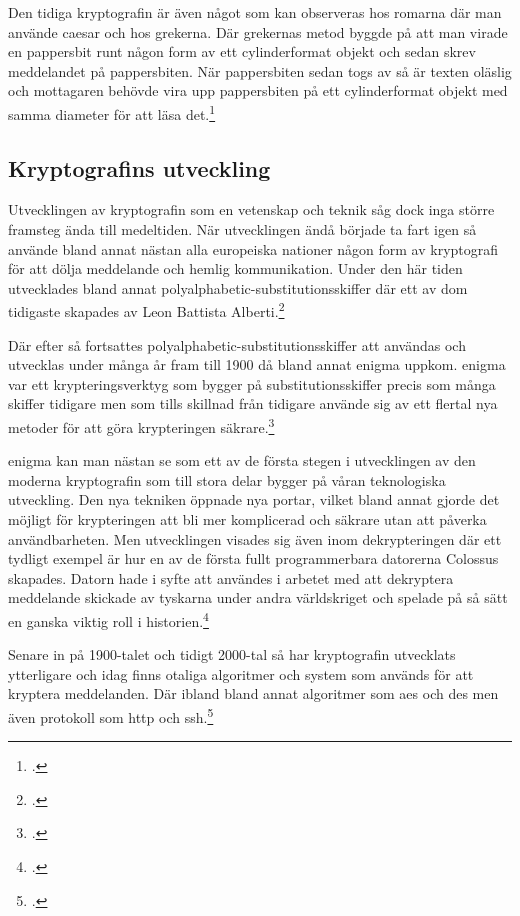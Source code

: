 Den tidiga kryptografin är även något som kan observeras hos romarna där
man använde \gls{caesar} och hos grekerna. Där grekernas metod byggde på
att man virade en pappersbit runt någon form av ett cylinderformat objekt
och sedan skrev meddelandet på pappersbiten. När pappersbiten sedan togs
av så är texten oläslig och mottagaren behövde vira upp pappersbiten på
ett cylinderformat objekt med samma diameter för att läsa det.\footcite{kryptografi-historia-1}

\subsection{Kryptografins utveckling} %
Utvecklingen av kryptografin som en vetenskap och teknik såg dock inga större framsteg
ända till medeltiden. När utvecklingen ändå började ta fart igen så använde bland annat
nästan alla europeiska nationer någon form av kryptografi för att dölja meddelande och hemlig kommunikation.
Under den här tiden utvecklades bland annat \gls{polyalphabetic-substitutionsskiffer} där ett av dom tidigaste skapades av
Leon Battista Alberti.\footcite{kryptografi-historia-1}

Där efter så fortsattes \gls{polyalphabetic-substitutionsskiffer} att användas och utvecklas
under många år fram till 1900 då bland annat \gls{enigma} uppkom. \gls{enigma} var ett krypteringsverktyg som
bygger på \gls{substitutionsskiffer} precis som många skiffer tidigare men som tills skillnad från tidigare
använde sig av ett flertal nya metoder för att göra krypteringen säkrare.\footcite{kryptografi-historia-1}

\gls{enigma} kan man nästan se som ett av de första stegen i utvecklingen av den moderna kryptografin som
till stora delar bygger på våran teknologiska utveckling. Den nya tekniken öppnade nya portar, vilket bland annat gjorde det möjligt
för krypteringen att bli mer komplicerad och säkrare utan att påverka användbarheten. Men utvecklingen visades sig även inom
dekrypteringen där ett tydligt exempel är hur en av de första fullt programmerbara datorerna Colossus skapades. Datorn hade i syfte
att användes i arbetet med att dekryptera meddelande skickade av tyskarna under andra världskriget och spelade på så sätt
en ganska viktig roll i historien.\footcite{krypto}

Senare in på 1900-talet och tidigt 2000-tal så har kryptografin utvecklats ytterligare och idag finns otaliga
algoritmer och system som används för att kryptera meddelanden. Där ibland bland annat algoritmer som \gls{aes} och \gls{des} men även
protokoll som \gls{http} och \gls{ssh}.\footcite{krypto}

